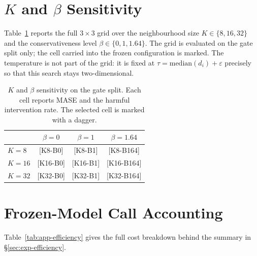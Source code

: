 \documentclass{article}
\newcommand{\ph}[1]{\textcolor{phgray}{\textsf{[#1]}}}
\begin{document}
\section{$K$ and $\beta$ Sensitivity}
\label{app:ksens}
Table~\ref{tab:app-ksens} reports the full $3 \times 3$ grid over the neighbourhood size
$K \in \{8, 16, 32\}$ and the conservativeness level $\beta \in \{0, 1, 1.64\}$. The grid is
evaluated on the gate split only; the cell carried into the frozen configuration is marked.
The temperature is not part of the grid: it is fixed at
$\tau = \mathrm{median}(d_i) + \varepsilon$ precisely so that this search stays two-dimensional.

\begin{table}[h]
  \caption{$K$ and $\beta$ sensitivity on the gate split. Each cell reports MASE and the
  harmful intervention rate. The selected cell is marked with a dagger.}
  \label{tab:app-ksens}
  \centering
  \small
  \setlength{\tabcolsep}{4pt}
  \begin{tabular}{lccc}
    \toprule
    & $\beta = 0$ & $\beta = 1$ & $\beta = 1.64$ \\
    \midrule
    $K = 8$  & \ph{K8-B0}  & \ph{K8-B1}  & \ph{K8-B164} \\
    $K = 16$ & \ph{K16-B0} & \ph{K16-B1} & \ph{K16-B164} \\
    $K = 32$ & \ph{K32-B0} & \ph{K32-B1} & \ph{K32-B164} \\
    \bottomrule
  \end{tabular}
\end{table}

\section{Frozen-Model Call Accounting}
\label{app:calls}
Table~\ref{tab:app-efficiency} gives the full cost breakdown behind the summary in
\S\ref{sec:exp-efficiency}.
\end{document}
